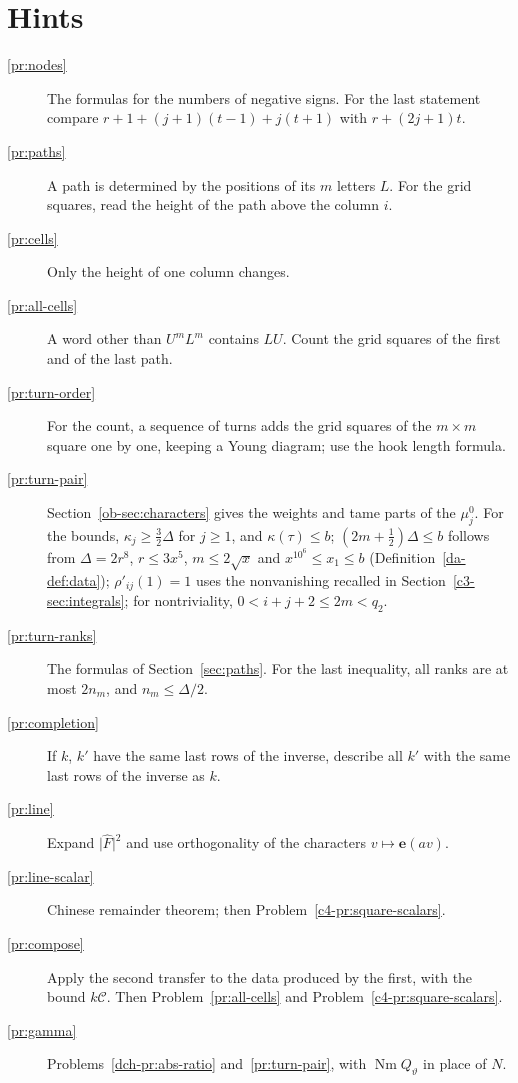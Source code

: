 \documentclass[reqno]{amsart}
\theoremstyle{definition}
\theoremstyle{plain}
\newcommand{\Nm}{\operatorname{Nm}}
\begin{document}
\section*{Hints}
\begin{description}
\item[\ref{pr:nodes}] The formulas for the numbers of negative signs.  For the last statement compare \(r + 1 + (j+1)(t-1) + j(t+1)\) with \(r + (2j+1)t\).
\item[\ref{pr:paths}] A path is determined by the positions of its \(m\) letters \(L\).  For the grid squares, read the height of the path above the column \(i\).
\item[\ref{pr:cells}] Only the height of one column changes.
\item[\ref{pr:all-cells}] A word other than \(U^mL^m\) contains \(LU\).  Count the grid squares of the first and of the last path.
\item[\ref{pr:turn-order}] For the count, a sequence of turns adds the grid squares of the \(m \times m\) square one by one, keeping a Young diagram; use the hook length formula.
\item[\ref{pr:turn-pair}] Section~\ref{ob-sec:characters} gives the weights and tame parts of the \(\mu_j^0\).  For the bounds, \(\kappa_j \ge \frac32\Delta\) for \(j \ge 1\), and \(\kappa(\tau) \le b\); \((2m + \frac12)\Delta \le b\) follows from \(\Delta = 2r^8\), \(r \le 3x^5\), \(m \le 2\sqrt x\) and \(x^{10^6} \le x_1 \le b\) (Definition~\ref{da-def:data}); \(\rho'_{ij}(1) = 1\) uses the nonvanishing recalled in Section~\ref{c3-sec:integrals}; for nontriviality, \(0 < i + j + 2 \le 2m < q_2\).
\item[\ref{pr:turn-ranks}] The formulas of Section~\ref{sec:paths}.  For the last inequality, all ranks are at most \(2n_m\), and \(n_m \le \Delta/2\).
\item[\ref{pr:completion}] If \(k\), \(k'\) have the same last rows of the inverse, describe all \(k'\) with the same last rows of the inverse as \(k\).
\item[\ref{pr:line}] Expand \(\lvert\hat F\rvert^2\) and use orthogonality of the characters \(v \mapsto \mathbf e(av)\).
\item[\ref{pr:line-scalar}] Chinese remainder theorem; then Problem~\ref{c4-pr:square-scalars}.
\item[\ref{pr:compose}] Apply the second transfer to the data produced by the first, with the bound \(k\mathcal C\).  Then Problem~\ref{pr:all-cells} and Problem~\ref{c4-pr:square-scalars}.
\item[\ref{pr:gamma}] Problems~\ref{dch-pr:abs-ratio} and~\ref{pr:turn-pair}, with \(\Nm Q_\vartheta\) in place of \(N\).

\end{description}
\end{document}
